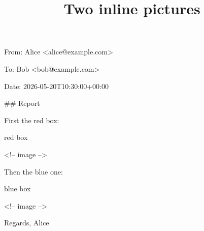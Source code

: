 \documentclass[11pt,a4paper]{article}
\title{Two inline pictures}
\begin{document}
\maketitle

From: Alice <alice@example.com>

To: Bob <bob@example.com>

Date: 2026-05-20T10:30:00+00:00

\#\# Report

First the red box:

red box

<!-- image -->

Then the blue one:

blue box

<!-- image -->

Regards, Alice
\end{document}

